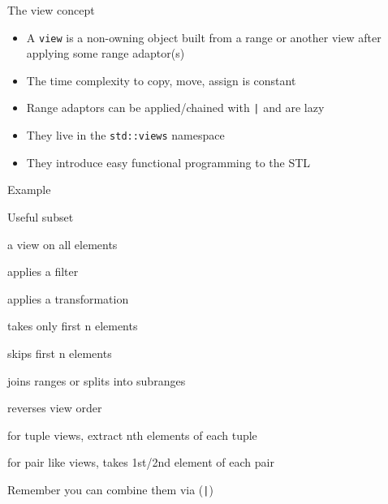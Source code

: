 \begin{frame}[fragile]
  \begin{block}{The view concept}
    \begin{itemize}
    \item A \texttt{view} is a non-owning object built from a range or another view after applying some range adaptor(s)
    \item The time complexity to copy, move, assign is constant
    \item Range adaptors can be applied/chained with \texttt{|} and are lazy
    \item They live in the \texttt{std::views} namespace
    \item They introduce easy functional programming to the STL
    \end{itemize}
  \end{block}
  \begin{exampleblock}{Example }
    { \small
    }
  \end{exampleblock}
\end{frame}

\begin{frame}[fragile]
  \begin{block}{Useful subset}
    \begin{description}
    \item[all] a view on all elements
    \item[filter] applies a filter
    \item[transform] applies a transformation
    \item[take] takes only first n elements
    \item[drop] skips first n elements
    \item[join/split] joins ranges or splits into subranges
    \item[reverse] reverses view order
    \item[elements] for tuple views, extract nth elements of each tuple
    \item[keys/values] for pair like views, takes 1st/2nd element of each pair
    \end{description}
  \end{block}
  Remember you can combine them via (\texttt{|})
\end{frame}

